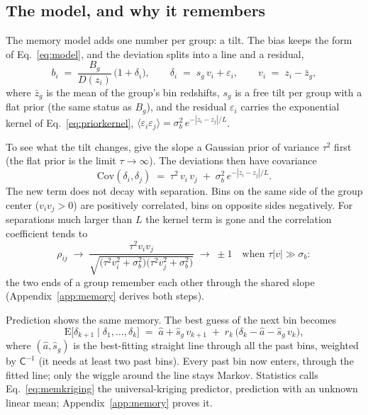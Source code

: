 \documentclass[11pt]{article}
\newcommand{\Cov}{\mathsf{C}}
\begin{document}
\subsection{The model, and why it remembers}
\label{sec:memmodel}

The memory model adds one number per group: a tilt.  The bias keeps
the form of Eq.~\eqref{eq:model}, and the deviation splits into a
line and a residual,
\begin{equation}
  b_i \;=\; \frac{B_g}{D(z_i)}\,\bigl(1 + \delta_i\bigr),
  \qquad
  \delta_i \;=\; s_g\, v_i + \varepsilon_i,
  \qquad
  v_i \;=\; z_i - \bar{z}_g,
  \label{eq:memdef}
\end{equation}
where $\bar{z}_g$ is the mean of the group's bin redshifts, $s_g$ is
a free tilt per group with a flat prior (the same status as $B_g$),
and the residual $\varepsilon_i$ carries the exponential kernel of
Eq.~\eqref{eq:priorkernel},
$\langle \varepsilon_i \varepsilon_j \rangle =
\sigma_b^2\, e^{-|z_i - z_j|/L}$.

To see what the tilt changes, give the slope a Gaussian prior of
variance $\tau^2$ first (the flat prior is the limit
$\tau \to \infty$).  The deviations then have covariance
\begin{equation}
  \mathrm{Cov}(\delta_i, \delta_j)
  \;=\;
  \tau^2\, v_i\, v_j
  \;+\;
  \sigma_b^2\, e^{-|z_i - z_j|/L} .
  \label{eq:memcov}
\end{equation}
The new term does not decay with separation.  Bins on the same side
of the group center ($v_i v_j > 0$) are positively correlated, bins
on opposite sides negatively.  For separations much larger than $L$
the kernel term is gone and the correlation coefficient tends to
\begin{equation}
  \rho_{ij}
  \;\longrightarrow\;
  \frac{\tau^2 v_i v_j}
       {\sqrt{\bigl(\tau^2 v_i^2 + \sigma_b^2\bigr)
              \bigl(\tau^2 v_j^2 + \sigma_b^2\bigr)}}
  \;\longrightarrow\; \pm 1
  \quad \text{when } \tau |v| \gg \sigma_b :
  \label{eq:memrho}
\end{equation}
the two ends of a group remember each other through the shared slope
(Appendix~\ref{app:memory} derives both steps).

Prediction shows the same memory.  The best guess of the next bin
becomes
\begin{equation}
  \mathrm{E}\bigl[\delta_{k+1} \mid \delta_1, \dots, \delta_k\bigr]
  \;=\;
  \hat{a} + \hat{s}_g\, v_{k+1}
  \;+\;
  r_k\,\bigl(\delta_k - \hat{a} - \hat{s}_g\, v_k\bigr),
  \label{eq:memkriging}
\end{equation}
where $(\hat{a}, \hat{s}_g)$ is the best-fitting straight line through
all the past bins, weighted by $\Cov^{-1}$ (it needs at least two
past bins).  Every past bin now enters, through the fitted line; only
the wiggle around the line stays Markov.  Statistics calls
Eq.~\eqref{eq:memkriging} the universal-kriging predictor, prediction
with an unknown linear mean; Appendix~\ref{app:memory} proves it.
\end{document}
